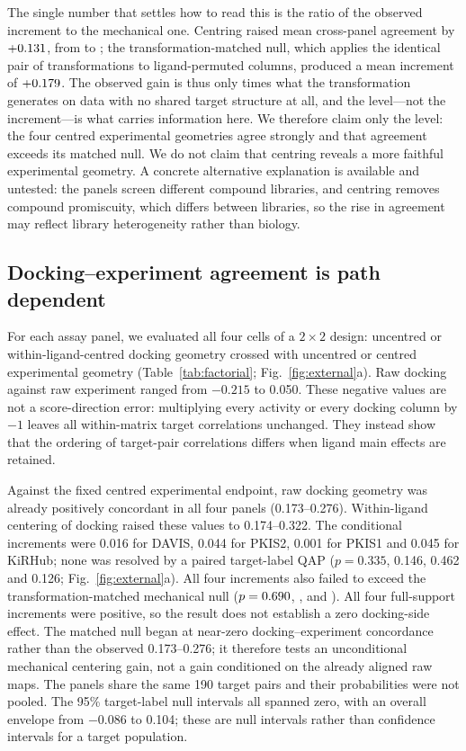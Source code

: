 \documentclass[11pt]{article}
\begin{document}
The single number that settles how to read this is the ratio of the observed increment to
the mechanical one. Centring raised mean cross-panel agreement by
$+0.131{}$, from \CrossPanelRaw{} to \CrossPanelCentered{}; the
transformation-matched null, which applies the identical pair of transformations to
ligand-permuted columns, produced a mean increment of $+0.179{}$. The
observed gain is thus only \CrossPanelGainOverMechanical{} times what the transformation
generates on data with no shared target structure at all, and the level---not the
increment---is what carries information here. We therefore claim only the level: the four
centred experimental geometries agree strongly and that agreement exceeds its matched null.
We do not claim that centring reveals a more faithful experimental geometry. A concrete
alternative explanation is available and untested: the panels screen different compound
libraries, and centring removes compound promiscuity, which differs between libraries, so the
rise in agreement may reflect library heterogeneity rather than biology.

\subsection{Docking--experiment agreement is path dependent}

For each assay panel, we evaluated all four cells of a $2\times2$ design: uncentred or
within-ligand-centred docking geometry crossed with uncentred or centred experimental
geometry (Table~\ref{tab:factorial}; Fig.~\ref{fig:external}a). Raw docking against raw
experiment ranged from $-0.215$ to 0.050. These negative values are not a score-direction
error: multiplying every activity or every docking column by $-1$ leaves all within-matrix
target correlations unchanged. They instead show that the ordering of target-pair
correlations differs when ligand main effects are retained.

Against the fixed centred experimental endpoint, raw docking geometry was already
positively concordant in all four panels (0.173--0.276). Within-ligand centering of docking
raised these values to 0.174--0.322. The conditional increments were 0.016 for DAVIS,
0.044 for PKIS2, 0.001 for PKIS1 and 0.045 for KiRHub; none was resolved by a paired
target-label QAP ($p=0.335$, 0.146, 0.462 and 0.126; Fig.~\ref{fig:external}a). All four
increments also failed to exceed the transformation-matched mechanical null
($p=0.690{}$, \PkisTwoDockingMatchedP{},
\PkisOneDockingMatchedP{} and \KiRHubDockingMatchedP{}). All four
full-support increments were positive, so the result does not establish a zero docking-side effect. The
matched null began at near-zero docking--experiment concordance rather than the observed
0.173--0.276; it therefore tests an unconditional mechanical centering gain, not a gain
conditioned on the already aligned raw maps.
The panels share the same 190 target pairs and their probabilities were not pooled. The 95\%
target-label null intervals all spanned zero, with an overall envelope from $-0.086$ to
0.104; these are null intervals rather than confidence intervals for a target population.
\end{document}
